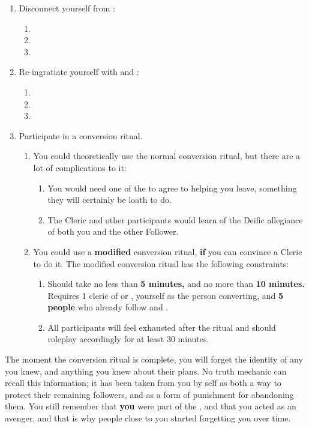 \documentclass[green]{GL2020}
\begin{document}
\begin{enumerate}
  \item Disconnect yourself from \cGenesis{}:
  \begin{enumerate}
    \item 
    \item 
    \item 
  \end{enumerate}
  \item Re-ingratiate yourself with \cEbb{} and \cFlow{}:
  \begin{enumerate}
    \item 
    \item 
    \item 
  \end{enumerate}
  \item Participate in a conversion ritual.
  \begin{enumerate}
    \item You could theoretically use the normal conversion ritual, but there are a lot of complications to it:
    \begin{enumerate}
      \item You would need one of the \pGoaties{} to agree to helping you leave, something they will certainly be loath to do.
      \item The Cleric and other participants would learn of the Deific allegiance of both you and the other Follower.
    \end{enumerate}
    \item You could use a \textbf{modified} conversion ritual, \textbf{if} you can convince a Cleric to do it. The modified conversion ritual has the following constraints:
    \begin{enumerate}
      \item Should take no less than \textbf{5 minutes,} and no more than \textbf{10 minutes.} Requires 1 cleric of \cEbb{} or \cFlow{}, yourself as the person converting, and \textbf{5 people} who already follow \cEbb{} and \cFlow{}.
      \item All participants will feel exhausted after the ritual and should roleplay accordingly for at least 30 minutes.
    \end{enumerate}
  \end{enumerate}
\end{enumerate}

The moment the conversion ritual is complete, you will forget the identity of any \pGoaties{} you knew, and anything you knew about their plans. No truth mechanic can recall this information; it has been taken from you by \cGenesis{} \cGenesis{\them}self as both a way to protect their remaining followers, and as a form of punishment for abandoning them. You still remember that \textbf{you} were part of the \pGoaties{}, and that you acted as an avenger, and that is why people close to you started forgetting you over time. 
\end{document}
